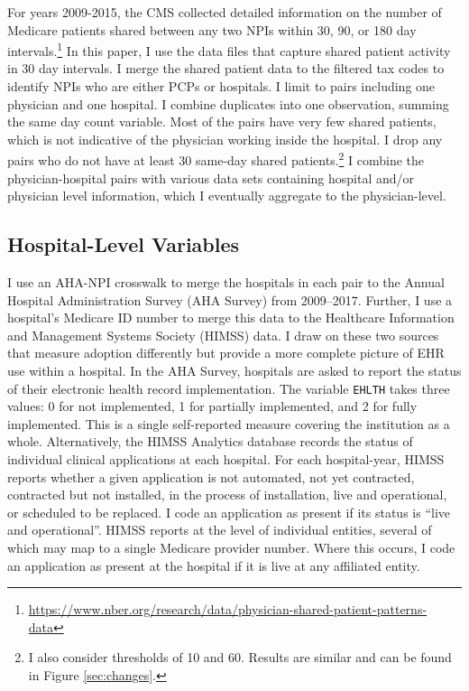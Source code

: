 \documentclass[12pt]{article}
\begin{document}
For years 2009-2015, the CMS collected detailed information on the number of Medicare patients shared between any two NPIs within 30, 90, or 180 day intervals.\footnote{\hyperlink{https://www.nber.org/research/data/physician-shared-patient-patterns-data}{https://www.nber.org/research/data/physician-shared-patient-patterns-data}} In this paper, I use the data files that capture shared patient activity in 30 day intervals. I merge the shared patient data to the filtered tax codes to identify NPIs who are either PCPs or hospitals. I limit to pairs including one physician and one hospital. I combine duplicates into one observation, summing the same day count variable. Most of the pairs have very few shared patients, which is not indicative of the physician working inside the hospital. I drop any pairs who do not have at least 30 same-day shared patients.\footnote{I also consider thresholds of 10 and 60. Results are similar and can be found in Figure \ref{sec:changes}.} I combine the physician-hospital pairs with various data sets containing hospital and/or physician level information, which I eventually aggregate to the physician-level.

\subsection{Hospital-Level Variables}\label{sec:hosplevel}

I use an AHA-NPI crosswalk to merge the hospitals in each pair to the Annual Hospital Administration Survey (AHA Survey) from 2009--2017. Further, I use a hospital's Medicare ID number to merge this data to the Healthcare Information and Management Systems Society (HIMSS) data. I draw on these two sources that measure adoption differently but provide a more complete picture of EHR use within a hospital. In the AHA Survey, hospitals are asked to report the status of their electronic health record implementation. The variable \texttt{EHLTH} takes three values: 0 for not implemented, 1 for partially implemented, and 2 for fully implemented. This is a
single self-reported measure covering the institution as a whole. Alternatively, the HIMSS Analytics database records the status of individual clinical applications at each hospital. For each hospital-year, HIMSS reports whether a given application is not automated, not yet contracted, contracted but not installed, in the process of installation, live and operational, or scheduled to be replaced. I code an application as present if its status is ``live and operational''. HIMSS reports at the level of individual entities, several of which may map to a single Medicare provider number. Where this occurs, I code an application as present at the hospital if it is live at any affiliated entity. 
\end{document}
